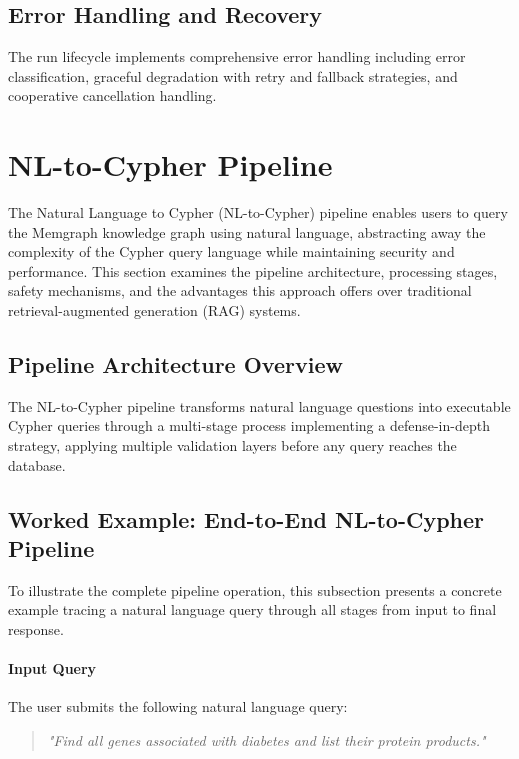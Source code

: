\documentclass[a4paper,twoside]{sapthesis}
\begin{document}
\subsection{Error Handling and Recovery}

The run lifecycle implements comprehensive error handling including error classification, graceful degradation with retry and fallback strategies, and cooperative cancellation handling.

\section{NL-to-Cypher Pipeline}
\label{sec:nl-cypher}

The Natural Language to Cypher (NL-to-Cypher) pipeline enables users to query the Memgraph knowledge graph using natural language, abstracting away the complexity of the Cypher query language while maintaining security and performance. This section examines the pipeline architecture, processing stages, safety mechanisms, and the advantages this approach offers over traditional retrieval-augmented generation (RAG) systems.

\subsection{Pipeline Architecture Overview}

The NL-to-Cypher pipeline transforms natural language questions into executable Cypher queries through a multi-stage process implementing a defense-in-depth strategy, applying multiple validation layers before any query reaches the database.

\subsection{Worked Example: End-to-End NL-to-Cypher Pipeline}

To illustrate the complete pipeline operation, this subsection presents a concrete example tracing a natural language query through all stages from input to final response.

\paragraph{Input Query}
The user submits the following natural language query:
\begin{quote}
\textit{"Find all genes associated with diabetes and list their protein products."}
\end{quote}
\end{document}
